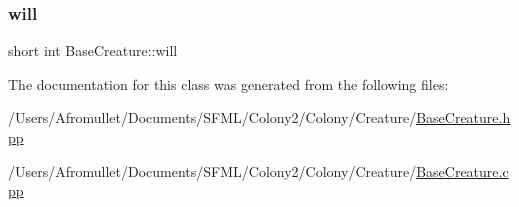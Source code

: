 \subsubsection{\texorpdfstring{will}{will}}
{\footnotesize\ttfamily short int Base\+Creature\+::will\hspace{0.3cm}{\ttfamily [private]}}



The documentation for this class was generated from the following files\+:\begin{DoxyCompactItemize}
\item 
/\+Users/\+Afromullet/\+Documents/\+S\+F\+M\+L/\+Colony2/\+Colony/\+Creature/\mbox{\hyperlink{_base_creature_8hpp}{Base\+Creature.\+hpp}}\item 
/\+Users/\+Afromullet/\+Documents/\+S\+F\+M\+L/\+Colony2/\+Colony/\+Creature/\mbox{\hyperlink{_base_creature_8cpp}{Base\+Creature.\+cpp}}\end{DoxyCompactItemize}
